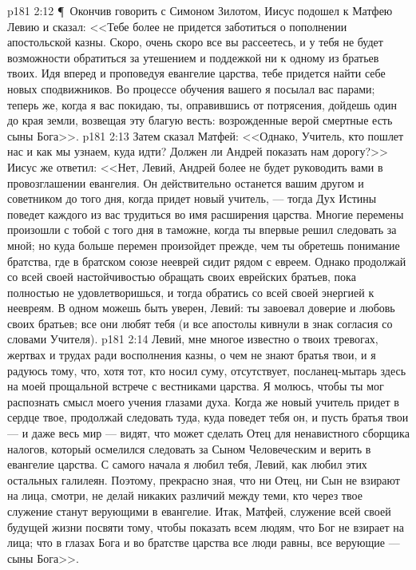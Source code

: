 \vs p181 2:12 \P\ Окончив говорить с Симоном Зилотом, Иисус подошел к Матфею Левию и сказал: <<Тебе более не придется заботиться о пополнении апостольской казны. Скоро, очень скоро все вы рассеетесь, и у тебя не будет возможности обратиться за утешением и поддежкой ни к одному из братьев твоих. Идя вперед и проповедуя евангелие царства, тебе придется найти себе новых сподвижников. Во процессе обучения вашего я посылал вас парами; теперь же, когда я вас покидаю, ты, оправившись от потрясения, дойдешь один до края земли, возвещая эту благую весть: возрожденные верой смертные есть сыны Бога>>.
\vs p181 2:13 Затем сказал Матфей: <<Однако, Учитель, кто пошлет нас и как мы узнаем, куда идти? Должен ли Андрей показать нам дорогу?>> Иисус же ответил: <<Нет, Левий, Андрей более не будет руководить вами в провозглашении евангелия. Он действительно останется вашим другом и советником до того дня, когда придет новый учитель, --- тогда Дух Истины поведет каждого из вас трудиться во имя расширения царства. Многие перемены произошли с тобой с того дня в таможне, когда ты впервые решил следовать за мной; но куда больше перемен произойдет прежде, чем ты обретешь понимание братства, где в братском союзе нееврей сидит рядом с евреем. Однако продолжай со всей своей настойчивостью обращать своих еврейских братьев, пока полностью не удовлетворишься, и тогда обратись со всей своей энергией к неевреям. В одном можешь быть уверен, Левий: ты завоевал доверие и любовь своих братьев; все они любят тебя (и все апостолы кивнули в знак согласия со словами Учителя).
\vs p181 2:14 Левий, мне многое известно о твоих тревогах, жертвах и трудах ради восполнения казны, о чем не знают братья твои, и я радуюсь тому, что, хотя тот, кто носил суму, отсутствует, посланец\hyp{}мытарь здесь на моей прощальной встрече с вестниками царства. Я молюсь, чтобы ты мог распознать смысл моего учения глазами духа. Когда же новый учитель придет в сердце твое, продолжай следовать туда, куда поведет тебя он, и пусть братья твои --- и даже весь мир --- видят, что может сделать Отец для ненавистного сборщика налогов, который осмелился следовать за Сыном Человеческим и верить в евангелие царства. С самого начала я любил тебя, Левий, как любил этих остальных галилеян. Поэтому, прекрасно зная, что ни Отец, ни Сын не взирают на лица, смотри, не делай никаких различий между теми, кто через твое служение станут верующими в евангелие. Итак, Матфей, служение всей своей будущей жизни посвяти тому, чтобы показать всем людям, что Бог не взирает на лица; что в глазах Бога и во братстве царства все люди равны, все верующие --- сыны Бога>>.
